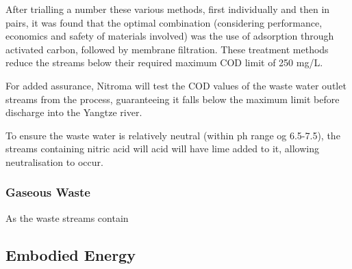 After trialling a number these various methods, first individually and then in pairs, it was found that the optimal combination (considering performance, economics and safety of materials involved) was the use of adsorption through activated carbon, followed by membrane filtration. These treatment methods reduce the streams below their required maximum COD limit of 250 mg/L. 

For added assurance, Nitroma will test the COD values of the waste water outlet streams from the process, guaranteeing it falls below the maximum limit before discharge into the Yangtze river. 




To ensure the waste water is relatively neutral (within ph range og 6.5-7.5), the streams containing nitric acid will acid will have lime added to it, allowing neutralisation to occur. 


\subsubsection{Gaseous Waste}

As the waste streams contain 











\subsection{Embodied Energy}